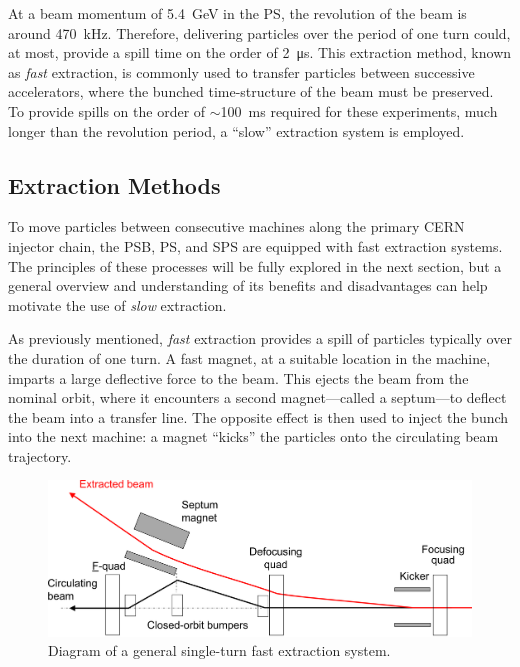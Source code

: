 \documentclass[11pt]{report}
\begin{document}
At a beam momentum of \qty{5.4}{\giga\electronvolt} in the PS, the revolution of the beam is around \qty{470}{kHz}. Therefore, delivering particles over the period of one turn could, at most, provide a spill time on the order of \qty{2}{\micro\second}. This extraction method, known as \textit{fast} extraction, is commonly used to transfer particles between successive accelerators, where the bunched time-structure of the beam must be preserved. To provide spills on the order of $\sim$\qty{100}{\ms} required for these experiments, much longer than the revolution period, a ``slow'' extraction system is employed.

\subsection{Extraction Methods}

To move particles between consecutive machines along the primary CERN injector chain, the PSB, PS, and SPS are equipped with fast extraction systems. The principles of these processes will be fully explored in the next section, but a general overview and understanding of its benefits and disadvantages can help motivate the use of \textit{slow} extraction. 

As previously mentioned, \textit{fast} extraction provides a spill of particles typically over the duration of one turn. A fast magnet, at a suitable location in the machine, imparts a large deflective force to the beam. This ejects the beam from the nominal orbit, where it encounters a second magnet---called a septum---to deflect the beam into a transfer line. The opposite effect is then used to inject the bunch into the next machine: a magnet ``kicks'' the particles onto the circulating beam trajectory.

\begin{figure}[h]
  \centering
  \includegraphics[width=\linewidth]{fast.png}
  \caption{Diagram of a general single-turn fast extraction system.~\cite{Fraser:CAS}}
  \label{fig:fast_diagram}
\end{figure}
\end{document}
